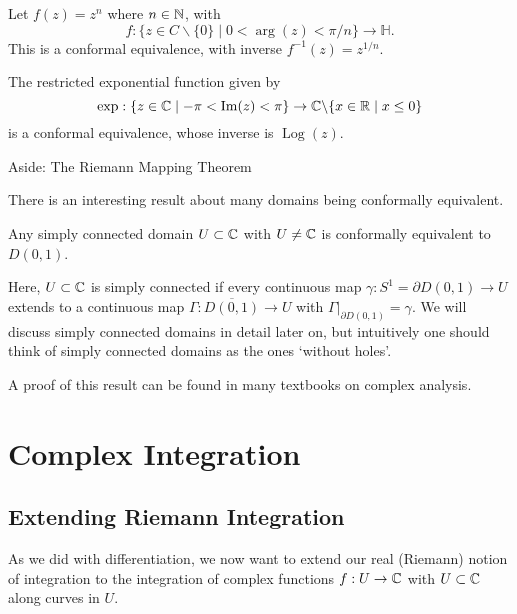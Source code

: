 \documentclass[a4paper]{scrartcl}
\begin{document}
\begin{example}
    Let $f(z) = z^n$ where $n \in \mathbb{N}$, with
    $$
    f: \{z \in C \backslash \{0\} \mid 0 < \arg(z) < \pi/n\} \rightarrow \mathbb{H}.
    $$
    This is a conformal equivalence, with inverse $f^{-1}(z) = z^{1/n}$.
\end{example}

\begin{example}
The restricted exponential function given by
$$
\exp: \{z \in \mathbb{C} \mid -\pi < \operatorname{Im} (z) < \pi\} \rightarrow \mathbb{C} \backslash \{x \in \mathbb{R} \mid x \leq 0\}
$$
is a conformal equivalence, whose inverse is $\operatorname{Log}(z)$.
\end{example}


\begin{aside}{Aside: The Riemann Mapping Theorem}

    There is an interesting result about many domains being conformally equivalent.
    
    \begin{theorem}        
        Any simply connected domain $U \subset \mathbb{C}$ with $U \neq \mathbb{C}$ is conformally equivalent to $D(0, 1)$.
    \end{theorem}

    Here, $U \subset \mathbb{C}$ is simply connected if every continuous map $\gamma: S^1 = \partial D(0, 1) \rightarrow U$ extends to a continuous map $\Gamma: \overline{D(0, 1)} \rightarrow U$ with $\left.\Gamma\right|_{\partial D(0, 1)} = \gamma$.
    We will discuss simply connected domains in detail later on, but intuitively one should think of simply connected domains as the ones `without holes'.
    
    A proof of this result can be found in many textbooks on complex analysis.

\end{aside}

\section{Complex Integration}

\subsection{Extending Riemann Integration}

As we did with differentiation, we now want to extend our real (Riemann) notion of integration to the integration of complex functions $f: U \rightarrow \mathbb{C}$ with $U \subset \mathbb{C}$ along curves in $U$.
\end{document}
